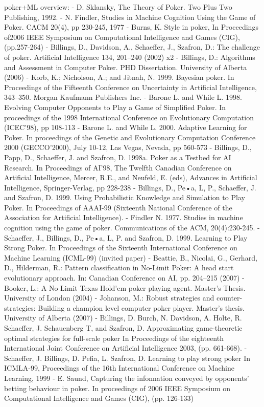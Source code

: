 poker+ML overview:
- D. Sklansky, The Theory of Poker. Two Plus Two Publishing, 1992.
- N. Findler, Studies in Machine Cognition Using the Game of Poker.
CACM 20(4), pp 230-245, 1977
- Burns, K. Style in poker, In Proceedings of2006 IEEE Symposium on
Computational Intelligence and Games (CIG), (pp.257-264)
- Billings, D., Davidson, A., Schaeffer, J., Szafron, D.: The challenge of poker. Artificial Intelligence
134, 201–240 (2002) x2
- Billings, D.: Algorithms and Assessment in Computer Poker. PHD Dissertation. University
of Alberta (2006)
- Korb, K.; Nicholson, A.; and Jitnah, N. 1999. Bayesian
poker. In Proceedings of the Fifteenth Conference on Uncertainty
in Artificial Intelligence, 343–350. Morgan Kaufmann
Publishers Inc.
- Barone L. and While L. 1998. Evolving Computer Opponents to Play a Game of Simplified
Poker. In proceedings of the 1998 International Conference on Evolutionary Computation
(ICEC’98), pp 108-113
- Barone L. and While L. 2000. Adaptive Learning for Poker. In proceedings of the Genetic and
Evolutionary Computation Conference 2000 (GECCO’2000), July 10-12, Las Vegas,
Nevada, pp 560-573
- Billings, D., Papp, D., Schaeffer, J. and Szafron, D. 1998a. Poker as a Testbed for AI Research.
In Proceedings of AI’98, The Twelfth Canadian Conference on Artificial Intelligence,
Mercer, R.E., and Neufeld, E. (eds), Advances in Artificial Intelligence, Springer-Verlag, pp
228-238
- Billings, D., Pe•a, L, P., Schaeffer, J. and Szafron, D. 1999. Using Probabilistic Knowledge
and Simulation to Play Poker. In Proceedings of AAAI-99 (Sixteenth National Conference
of the Association for Artificial Intelligence).
- Findler N. 1977. Studies in machine cognition using the game of poker. Communications of
the ACM, 20(4):230-245.
- Schaeffer, J., Billings, D., Pe•a, L, P. and Szafron, D. 1999. Learning to Play Strong Poker. In
Proceedings of the Sixteenth International Conference on Machine Learning (ICML-99)
(invited paper)
- Beattie, B., Nicolai, G., Gerhard, D., Hilderman, R.: Pattern classification in No-Limit Poker:
A head start evolutionary approach. In: Canadian Conference on AI, pp. 204–215 (2007)
- Booker, L.: A No Limit Texas Hold’em poker playing agent. Master’s Thesis. University of
London (2004)
- Johanson, M.: Robust strategies and counter-strategies: Building a champion level computer
poker player. Master’s thesis. University of Alberta (2007)
- Billings, D. Burch, N. Davidson, A. Holte, R. Schaeffer, J. Schauenberg
T, and Szafron, D. Approximating game-theoretic optimal strategies for
full-scale poker In Proceedings of the eighteenth International Joint
Conference on Artificial Intelligence 2003, (pp. 661-668).
- Schaeffer, J. Billings, D. Pefia, L. Szafron, D. Learning to play strong
poker In ICMLA-99, Proceedings of the 16th International Conference
on Machine Learning, 1999
- E. Saund, Capturing the infonnation conveyed by opponents' betting
behaviour in poker. In proceedings of 2006 IEEE Symposium on
Computational Intelligence and Games (CIG), (pp. 126-133)


